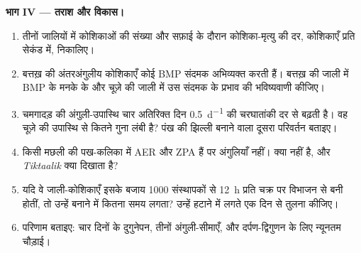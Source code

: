 \begin{problem}
\medskip
\noindent\textbf{भाग IV --- तराश और विकास।}
\begin{enumerate}[resume]
  \item तीनों जालियों में कोशिकाओं की संख्या और सफ़ाई के दौरान
        कोशिका-मृत्यु की दर, कोशिकाएँ प्रति सेकंड में, निकालिए।
  \item बत्तख़ की अंतरअंगुलीय कोशिकाएँ कोई BMP संदमक अभिव्यक्त करती हैं।
        बत्तख़ की जाली में BMP के मनके के और चूज़े की जाली में उस
        संदमक के प्रभाव की भविष्यवाणी कीजिए।
  \item चमगादड़ की अंगुली-उपास्थि चार अतिरिक्त दिन \qty{0.5}{d^{-1}}
        की चरघातांकी दर से बढ़ती है। वह चूज़े की उपास्थि से कितने गुना
        लंबी है? पंख की झिल्ली बनाने वाला दूसरा परिवर्तन बताइए।
  \item किसी मछली की पख-कलिका में AER और ZPA हैं पर अंगुलियाँ नहीं।
        क्या नहीं है, और \emph{Tiktaalik} क्या दिखाता है?
  \item यदि वे जाली-कोशिकाएँ इसके बजाय \num{1000} संस्थापकों से
        \qty{12}{h} प्रति चक्र पर विभाजन से बनी होतीं, तो उन्हें बनाने
        में कितना समय लगता? उन्हें हटाने में लगते एक दिन से तुलना कीजिए।
  \item परिणाम बताइए: चार दिनों के दुगुनेपन, तीनों अंगुली-सीमाएँ,
        और दर्पण-द्विगुणन के लिए न्यूनतम चौड़ाई।
\end{enumerate}
\end{problem}
